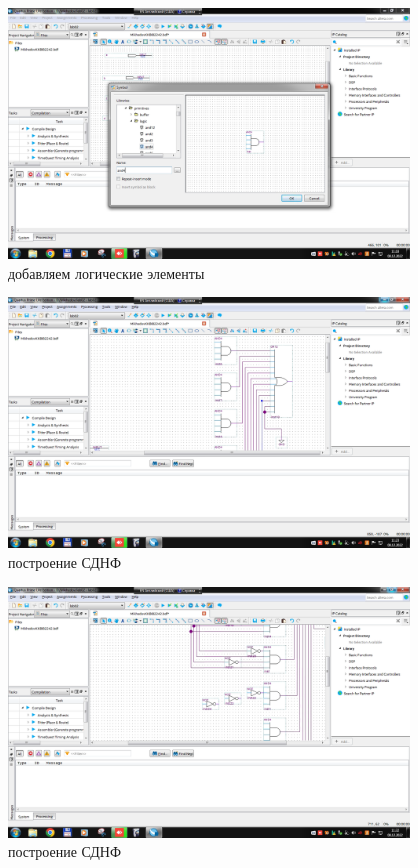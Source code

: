 \documentclass[a4paper]{article}
\begin{document}
  \begin{figure}[H]
    \centering
    \includegraphics[width=0.9475\textwidth]{02_13}
    \caption{добавляем логические элементы}
  \end{figure}
  
  \begin{figure}[H]
    \centering
    \includegraphics[width=0.9475\textwidth]{02_14}
    \caption{построение СДНФ}
  \end{figure}
  
  \begin{figure}[H]
    \centering
    \includegraphics[width=0.9475\textwidth]{02_15}
    \caption{построение СДНФ}
  \end{figure}
  
\end{document}
